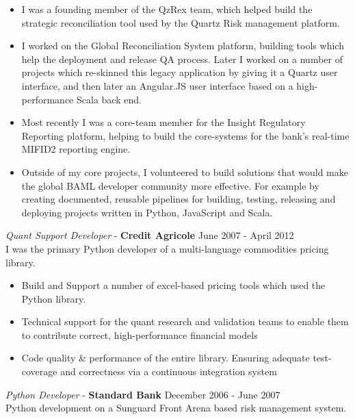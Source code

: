 \documentclass[margin, 10pt]{res} %
\begin{document}
\begin{resume}
        \begin{itemize}
            \item I was a founding member of the QzRex team, which helped build the strategic reconciliation tool used by the Quartz Risk management platform.
            \item I worked on the Global Reconciliation System platform, building tools which help the deployment and release QA process. Later I worked on a number of projects which re-skinned this legacy application by giving it a Quartz user interface, and then later an Angular.JS user interface based on a high-performance Scala back end.
            \item Most recently I was a core-team member for the Insight Regulatory Reporting platform, helping to build the core-systems for the bank's real-time MIFID2 reporting engine.
            \item Outside of my core projects, I volunteered to build solutions that would make the global BAML developer community more effective. For example by creating documented, reusable pipelines for building, testing, releasing and deploying projects written in Python, JavaScript and Scala.
        \end{itemize}

        {\sl Quant Support Developer} - \textbf{Credit Agricole} \hfill June 2007 - April 2012 \\

        I was the primary Python developer of a multi-language commodities pricing library.

        \begin{itemize}
            \item Build and Support a number of excel-based pricing tools which used the Python library.
            \item Technical support for the quant research and validation teams to enable them to contribute correct, high-performance financial models
            \item Code quality \& performance of the entire library. Ensuring adequate test-coverage and correctness via a continuous integration system
        \end{itemize}

        {\sl Python Developer} - \textbf{Standard Bank} \hfill December 2006 - June 2007\\

        Python development on a Sunguard Front Arena based risk management system.


\end{resume}
\end{document}

